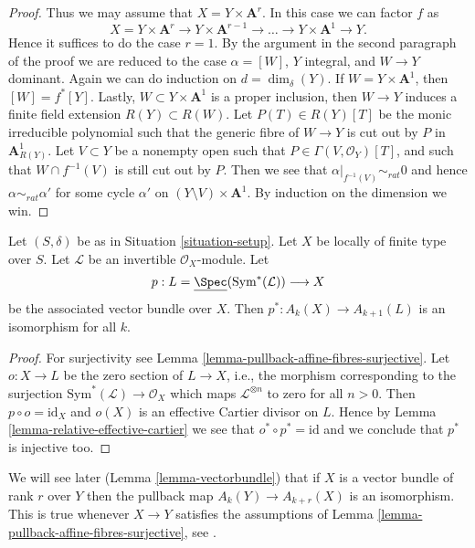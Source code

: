 \begin{proof}
\medskip\noindent
Thus we may assume that $X = Y \times \mathbf{A}^r$.
In this case we can factor $f$ as
$$
X = Y \times \mathbf{A}^r \to
Y \times \mathbf{A}^{r - 1} \to \ldots \to
Y \times \mathbf{A}^1 \to Y.
$$
Hence it suffices to do the case $r = 1$. By the argument in the
second paragraph of the proof we are reduced to the case
$\alpha = [W]$, $Y$ integral, and $W \to Y$ dominant.
Again we can do induction on $d = \dim_\delta(Y)$.
If $W = Y \times \mathbf{A}^1$, then $[W] = f^*[Y]$.
Lastly, $W \subset Y \times \mathbf{A}^1$ is a proper inclusion,
then $W \to Y$ induces a finite field extension $R(Y) \subset R(W)$.
Let $P(T) \in R(Y)[T]$ be the monic irreducible polynomial such
that the generic fibre of $W \to Y$ is cut out by $P$ in
$\mathbf{A}^1_{R(Y)}$. Let $V \subset Y$ be a nonempty open such
that $P \in \Gamma(V, \mathcal{O}_Y)[T]$, and such that
$W \cap f^{-1}(V)$ is still cut out by $P$. Then we see that
$\alpha|_{f^{-1}(V)} \sim_{rat} 0$ and hence $\alpha \sim_{rat} \alpha'$
for some cycle $\alpha'$ on $(Y \setminus V) \times \mathbf{A}^1$.
By induction on the dimension we win.
\end{proof}

\begin{lemma}
\label{lemma-linebundle}
Let $(S, \delta)$ be as in Situation \ref{situation-setup}.
Let $X$ be locally of finite type over $S$.
Let $\mathcal{L}$ be an invertible $\mathcal{O}_X$-module.
Let
$$
p :
L = \underline{\Spec}(\text{Sym}^*(\mathcal{L}))
\longrightarrow
X
$$
be the associated vector bundle over $X$.
Then $p^* : A_k(X) \to A_{k + 1}(L)$ is an isomorphism for all $k$.
\end{lemma}

\begin{proof}
For surjectivity see Lemma \ref{lemma-pullback-affine-fibres-surjective}.
Let $o : X \to L$ be the zero section of $L \to X$, i.e., the morphism
corresponding to the surjection $\text{Sym}^*(\mathcal{L}) \to \mathcal{O}_X$
which maps $\mathcal{L}^{\otimes n}$ to zero for all $n > 0$.
Then $p \circ o = \text{id}_X$ and $o(X)$ is an effective
Cartier divisor on $L$. Hence by Lemma \ref{lemma-relative-effective-cartier}
we see that $o^* \circ p^* = \text{id}$ and we conclude that $p^*$ is
injective too.
\end{proof}

\begin{remark}
\label{remark-when-isomorphism}
We will see later (Lemma \ref{lemma-vectorbundle}) that if $X$ is a
vector bundle of rank $r$ over $Y$ then the pullback map
$A_k(Y) \to A_{k + r}(X)$
is an isomorphism. This is true whenever $X \to Y$ satisfies
the assumptions of Lemma \ref{lemma-pullback-affine-fibres-surjective}, see
\cite[Lemma 2.2]{Totaro-group}.
\end{remark}







